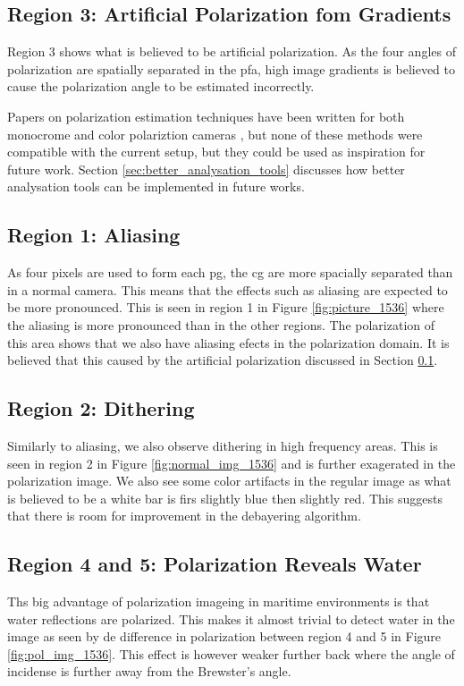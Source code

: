 \subsection{Region 3: Artificial Polarization fom Gradients}
\label{sec:artifical_polarization}
Region 3 shows what is believed to be artificial polarization.
As the four angles of polarization are spatially separated in the \gls{pfa}, high image gradients is believed to cause the polarization angle to be estimated incorrectly.

Papers on polarization estimation techniques have been written for both monocrome and color polariztion cameras  \cite{mihoubiSurveyDemosaickingMethods2018} \cite{spoteJointDemosaicingColour2021}, but
none of these methods were compatible with the current setup, but they could be used as inspiration for future work.
Section \ref{sec:better_analysation_tools} discusses how better analysation tools can be implemented in future works.

\subsection{Region 1: Aliasing}
As four pixels are used to form each \gls{pg}, the \gls{cg} are more spacially separated than in a normal camera.
This means that the effects such as aliasing are expected to be more pronounced.
This is seen in region 1 in Figure \ref{fig:picture_1536} where the aliasing is more pronounced than in the other regions.
The polarization of this area shows that we also have aliasing efects in the polarization domain.
It is believed that this caused by the artificial polarization discussed in Section \ref{sec:artifical_polarization}.

\subsection{Region 2: Dithering}
Similarly to aliasing, we also observe dithering in high frequency areas.
This is seen in region 2 in Figure \ref{fig:normal_img_1536} and is further exagerated in the polarization image.
We also see some color artifacts in the regular image as what is believed to be a white bar is firs slightly blue then slightly red.
This suggests that there is room for improvement in the debayering algorithm.

\subsection{Region 4 and 5: Polarization Reveals Water}
Ths big advantage of polarization imageing in maritime environments is that water reflections are polarized.
This makes it almost trivial to detect water in the image as seen by de difference in polarization between region 4 and 5 in Figure \ref{fig:pol_img_1536}.
This effect is however weaker further back where the angle of incidense is further away from the Brewster's angle.


